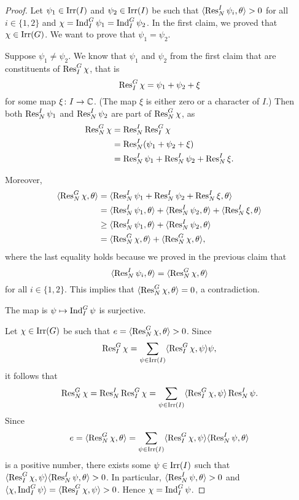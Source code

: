 \begin{proof}
    Let $\psi_1\in\operatorname{Irr}(I)$ and $\psi_2\in\operatorname{Irr}(I)$ 
    be such that 
    $\langle\operatorname{Res}_N^I\psi_i,\theta\rangle>0$ for all $i\in\{1,2\}$ and 
    $\chi=\operatorname{Ind}_I^G\psi_1=\operatorname{Ind}_I^G\psi_2$. In the first claim, we proved that $\chi\in\operatorname{Irr}(G)$. 
    We want to prove that $\psi_1=\psi_2$. 
    
    Suppose $\psi_1\ne\psi_2$. 
    We know that $\psi_1$ and $\psi_2$ from the first claim that
    are constituents
    of $\operatorname{Res}_I^G\chi$, that is 
    \[
    \operatorname{Res}_I^G\chi=\psi_1+\psi_2+\xi 
    \]
    for some map $\xi\colon I\to\mathbb{C}$. (The map $\xi$ is either zero
    or a character of $I$.) 
    Then both $\operatorname{Res}_N^I\psi_1$ and 
    $\operatorname{Res}_N^I\psi_2$ are part  
    of 
    $\operatorname{Res}_N^G\chi$, as  
    \begin{align*}
        \operatorname{Res}_N^G\chi&=\operatorname{Res}_N^I\operatorname{Res}_I^G\chi\\
        &=\operatorname{Res}_N^I(\psi_1+\psi_2+\xi)\\
        &=\operatorname{Res}_N^I\psi_1+\operatorname{Res}_N^I\psi_2+\operatorname{Res}_N^I\xi.       
    \end{align*}

    Moreover, 
    \begin{align*}
        \langle\operatorname{Res}_N^G\chi,\theta\rangle &= \langle\operatorname{Res}_N^I\psi_1+\operatorname{Res}_N^I\psi_2+\operatorname{Res}_N^I\xi,\theta\rangle\\
        &=\langle\operatorname{Res}_N^I\psi_1,\theta\rangle+\langle\operatorname{Res}_N^I\psi_2,\theta\rangle+\langle\operatorname{Res}_N^I\xi,\theta\rangle\\
&\geq\langle\operatorname{Res}_N^I\psi_1,\theta\rangle+\langle\operatorname{Res}_N^I\psi_2,\theta\rangle\\
        &=\langle\operatorname{Res}_N^G\chi,\theta\rangle+\langle\operatorname{Res}_N^G\chi,\theta\rangle,
    \end{align*}
    where the last equality holds because we proved in the previous claim that 
    \[
        \langle\operatorname{Res}_N^I\psi_i,\theta\rangle=\langle\operatorname{Res}_N^G\chi,\theta\rangle
    \]
    for all $i\in\{1,2\}$. 
    This implies that $\langle\operatorname{Res}_N^G\chi,\theta\rangle=0$, a contradiction. 

    \begin{claim}
        The map is $\psi\mapsto\operatorname{Ind}_I^G\psi$ is surjective. 
    \end{claim}

    Let $\chi\in\operatorname{Irr}(G)$ be such that 
    $e=\langle\operatorname{Res}_N^G\chi,\theta\rangle>0$. Since 
    \[
    \operatorname{Res}_I^G\chi=\sum_{\psi\in\operatorname{Irr}(I)}\langle\operatorname{Res}_I^G\chi,\psi\rangle\psi,
    \]
    it follows that 
    \[
    \operatorname{Res}_N^G\chi=\operatorname{Res}_N^I\operatorname{Res}_I^G\chi
    =\sum_{\psi\in\operatorname{Irr}(I)}\langle\operatorname{Res}_I^G\chi,\psi\rangle\operatorname{Res}_N^I\psi.
    \]
    Since 
    \[
    e=\langle\operatorname{Res}_N^G\chi,\theta\rangle=
    \sum_{\psi\in\operatorname{Irr}(I)}\langle\operatorname{Res}_I^G\chi,\psi\rangle\langle\operatorname{Res}_N^I\psi,\theta\rangle
    \]
    is a positive number, there exists some $\psi\in\operatorname{Irr}(I)$ 
    such that $\langle\operatorname{Res}_I^G\chi,\psi\rangle\langle\operatorname{Res}_N^I\psi,\theta\rangle>0$. In particular, 
    $\langle\operatorname{Res}_N^I\psi,\theta\rangle>0$ and 
    $\langle\chi,\operatorname{Ind}_I^G\psi\rangle=\langle\operatorname{Res}_I^G\chi,\psi\rangle>0$. 
    Hence $\chi=\operatorname{Ind}_I^G\psi$. 
\end{proof}

